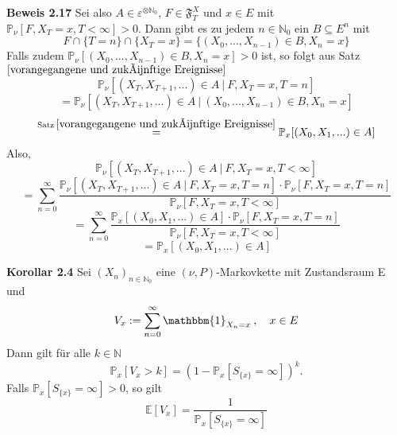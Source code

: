 \textbf{Beweis 2.17}
Sei also $ A \in \varepsilon^{ \otimes \mathbb{N}_{0}}$, $F \in \mathfrak{F}_{T}^{X}$ und $x \in E$ mit $\mathbb{P}_{\nu}[F, X_{T} = x, T < \infty] > 0$. Dann gibt es zu jedem $n \in \mathbb{N}_{0}$ ein $B \subseteq E^{n}$ mit
\begin{equation*}
F \cap \lbrace T = n \rbrace \cap \lbrace X_{T} = x \rbrace = \lbrace (X_{0},...,X_{n-1}) \in B, X_{n} = x \rbrace
\end{equation*}
Falls zudem $\mathbb{P}_{\nu}[(X_{0},...,X_{n-1}) \in B, X_{n} = x] > 0$ ist, so folgt aus Satz $\ref{vorangegangene und zukünftige Ereignisse}$
\begin{equation*}
\mathbb{P}_{\nu}[(X_{T},X_{T+1},...) \in A \: | \: F, X_{T} = x, T = n]
\end{equation*}
\begin{equation*}
= \mathbb{P}_{\nu}[(X_{T},X_{T+1},...) \in A \: | \: (X_{0},...,X_{n-1}) \in B, X_{n} = x]
\end{equation*}
\begin{equation*}
\stackrel{\mathrm{Satz} \: \ref{vorangegangene und zukünftige Ereignisse}}{=} \mathbb{P}_{x}[(X_{0},X_{1},...) \in A]
\end{equation*}
Also,
\begin{equation*}
\mathbb{P}_{\nu}[(X_{T},X_{T+1},...) \in A \: | \: F, X_{T} = x, T < \infty]
\end{equation*}
\begin{equation*}
= \sum_{n=0}^{\infty} \dfrac{\mathbb{P}_{\nu}[(X_{T},X_{T+1},...) \in A \: | \: F, X_{T} = x, T = n] \cdot \mathbb{P}_{\nu}[F, X_{T} = x, T = n]}{ \mathbb{P}_{\nu}[F, X_{T} = x, T < \infty]} 
\end{equation*}
\begin{equation*}
= \sum_{n=0}^{\infty} \dfrac{\mathbb{P}_{x}[(X_{0},X_{1},...) \in A] \cdot \mathbb{P}_{\nu}[F, X_{T} = x, T = n]}{ \mathbb{P}_{\nu}[F, X_{T} = x, T < \infty]} 
\end{equation*}
\begin{equation*}
= \mathbb{P}_{x}[(X_{0},X_{1},...) \in A]
\end{equation*}

\textbf{Korollar 2.4}
\label{Anzahl Besuche}
Sei $(X_{n})_{n \in \mathbb{N}_{0}}$ eine $(\nu,P)$-Markovkette mit Zustandsraum E und 
\begin{equation*}
V_{x} := \sum_{n=0}^{\infty} \mathbbm{1}_{X_{n} = x} \: , \quad x \in E
\end{equation*}
Dann gilt für alle $k \in \mathbb{N}$ 
\begin{equation*}
\mathbb{P}_{x}[V_{x} > k] = (1-\mathbb{P}_{x}[S_{\lbrace x \rbrace} = \infty] )^{k}.
\end{equation*}
Falls $\mathbb{P}_{x}[S_{\lbrace x \rbrace} = \infty] > 0$, so gilt
\begin{equation*}
\mathbb{E}[V_{x}] = \dfrac{1}{\mathbb{P}_{x}[S_{\lbrace x \rbrace} = \infty]}
\end{equation*}

